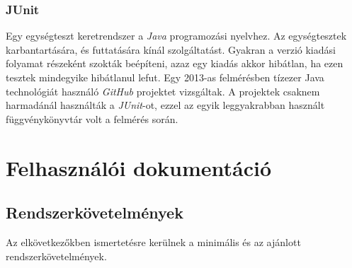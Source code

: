 \documentclass{elteikthesis}
\begin{document}
\subsection{JUnit}
Egy egységteszt keretrendszer a \emph{Java} programozási nyelvhez. Az egységtesztek karbantartására, és futtatására kínál szolgáltatást. Gyakran a verzió kiadási folyamat részeként szokták beépíteni, azaz egy kiadás akkor hibátlan, ha ezen tesztek mindegyike hibátlanul lefut. Egy 2013-as felmérésben\cite{Survey} tízezer Java technológiát használó \emph{GitHub} projektet vizsgáltak. A projektek csaknem harmadánál használták a \emph{JUnit}-ot, ezzel az egyik leggyakrabban használt függvénykönyvtár volt a felmérés során.

\chapter{Felhasználói dokumentáció}
\section{Rendszerkövetelmények}
Az elkövetkezőkben ismertetésre kerülnek a minimális és az ajánlott rendszerkövetelmények.
\end{document}

